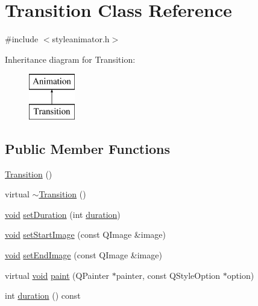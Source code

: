 \hypertarget{class_transition}{\section{\-Transition \-Class \-Reference}
\label{class_transition}
}


{\ttfamily \#include $<$styleanimator.\-h$>$}

\-Inheritance diagram for \-Transition\-:\begin{figure}[H]
\begin{center}
\leavevmode
\includegraphics[height=2.000000cm]{class_transition}
\end{center}
\end{figure}
\subsection*{\-Public \-Member \-Functions}
\begin{DoxyCompactItemize}
\item 
\hyperlink{group___core_plugin_ga73b44b2338b11807f77b620a3e810f92}{\-Transition} ()
\item 
virtual \hyperlink{group___core_plugin_ga2ca526d60e33b0391b4d4bd8c741b84b}{$\sim$\-Transition} ()
\item 
\hyperlink{group___u_a_v_objects_plugin_ga444cf2ff3f0ecbe028adce838d373f5c}{void} \hyperlink{group___core_plugin_gac1ee692f22e664b579cdb9eb71bb1085}{set\-Duration} (int \hyperlink{group___core_plugin_ga2781139e5618d7a0b897c2888da5c540}{duration})
\item 
\hyperlink{group___u_a_v_objects_plugin_ga444cf2ff3f0ecbe028adce838d373f5c}{void} \hyperlink{group___core_plugin_gae6ddc8589ddb86e4fa856fdf8a6a0502}{set\-Start\-Image} (const \-Q\-Image \&image)
\item 
\hyperlink{group___u_a_v_objects_plugin_ga444cf2ff3f0ecbe028adce838d373f5c}{void} \hyperlink{group___core_plugin_ga818f427a141b261cbfa43618e903c2a1}{set\-End\-Image} (const \-Q\-Image \&image)
\item 
virtual \hyperlink{group___u_a_v_objects_plugin_ga444cf2ff3f0ecbe028adce838d373f5c}{void} \hyperlink{group___core_plugin_ga946927bd34336c171288d0a6460fbbcb}{paint} (\-Q\-Painter $\ast$painter, const \-Q\-Style\-Option $\ast$option)
\item 
int \hyperlink{group___core_plugin_ga2781139e5618d7a0b897c2888da5c540}{duration} () const 
\end{DoxyCompactItemize}
